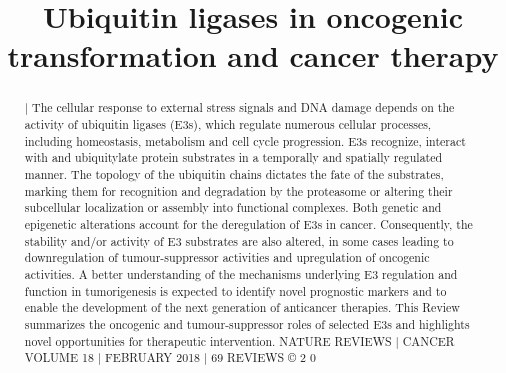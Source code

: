 \title{Ubiquitin ligases in oncogenic transformation and cancer therapy}

\maketitle

\begin{abstract}
| The cellular response to external stress signals and DNA damage depends on the activity of ubiquitin ligases (E3s), which regulate numerous cellular processes, including homeostasis, metabolism and cell cycle progression. E3s recognize, interact with and ubiquitylate protein substrates in a temporally and spatially regulated manner. The topology of the ubiquitin chains dictates the fate of the substrates, marking them for recognition and degradation by the proteasome or altering their subcellular localization or assembly into functional complexes. Both genetic and epigenetic alterations account for the deregulation of E3s in cancer. Consequently, the stability and/or activity of E3 substrates are also altered, in some cases leading to downregulation of tumour-suppressor activities and upregulation of oncogenic activities. A better understanding of the mechanisms underlying E3 regulation and function in tumorigenesis is expected to identify novel prognostic markers and to enable the development of the next generation of anticancer therapies. This Review summarizes the oncogenic and tumour-suppressor roles of selected E3s and highlights novel opportunities for therapeutic intervention. NATURE REVIEWS | CANCER VOLUME 18 | FEBRUARY 2018 | 69 REVIEWS © 2 0
\end{abstract}

